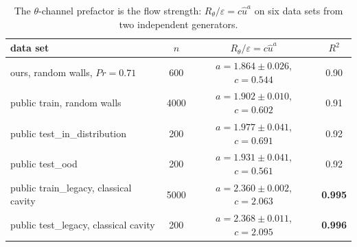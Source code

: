 \documentclass[preprint,11pt,a4paper,times]{elsarticle}
\begin{document}
\begin{table}[htbp]
\centering
\small
\caption{The $\theta$-channel prefactor is the flow strength: $R_\theta/\varepsilon=c\hat u^a$ on
six data sets from two independent generators.}
\label{tab:uhat}
\begin{tabular}{@{}lccc@{}}
\toprule
data set & $n$ & $R_\theta/\varepsilon=c\hat u^a$ & $R^2$\\
\midrule
ours, random walls, $Pr=0.71$ & 600 & $a=1.864\pm0.026$, $c=0.544$ & 0.90\\
public train, random walls & 4000 & $a=1.902\pm0.010$, $c=0.602$ & 0.91\\
public test\_in\_distribution & 200 & $a=1.977\pm0.041$, $c=0.691$ & 0.92\\
public test\_ood & 200 & $a=1.931\pm0.041$, $c=0.561$ & 0.92\\
public train\_legacy, classical cavity & 5000 & $a=2.360\pm0.002$, $c=2.063$ & \textbf{0.995}\\
public test\_legacy, classical cavity & 200 & $a=2.368\pm0.011$, $c=2.095$ & \textbf{0.996}\\
\bottomrule
\end{tabular}
\end{table}
\end{document}
